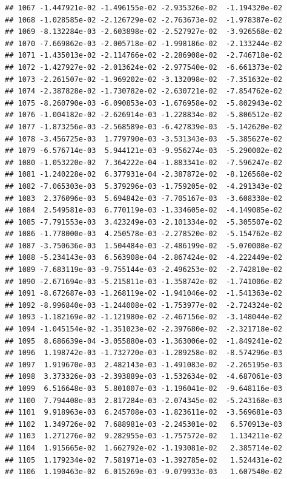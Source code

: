 \documentclass[
]{article}
\begin{document}
\begin{verbatim}
## 1067 -1.447921e-02 -1.496155e-02 -2.935326e-02  -1.194320e-02
## 1068 -1.028585e-02 -2.126729e-02 -2.763673e-02  -1.978387e-02
## 1069 -8.132284e-03 -2.603898e-02 -2.527927e-02  -3.926568e-02
## 1070 -7.669862e-03 -2.005718e-02 -1.998186e-02  -2.133244e-02
## 1071 -1.435013e-02 -2.114766e-02 -2.286908e-02  -2.746718e-02
## 1072 -1.427927e-02 -2.013624e-02 -2.977540e-02  -6.661373e-02
## 1073 -2.261507e-02 -1.969202e-02 -3.132098e-02  -7.351632e-02
## 1074 -2.387828e-02 -1.730782e-02 -2.630721e-02  -7.854762e-02
## 1075 -8.260790e-03 -6.090853e-03 -1.676958e-02  -5.802943e-02
## 1076 -1.004182e-02 -2.626914e-03 -1.228834e-02  -5.806512e-02
## 1077 -1.873256e-03 -2.568589e-03 -6.427839e-03  -5.142620e-02
## 1078 -3.456725e-03  1.779790e-03 -3.531343e-03  -5.385627e-02
## 1079 -6.576714e-03  5.944121e-03 -9.956274e-03  -5.290002e-02
## 1080 -1.053220e-02  7.364222e-04 -1.883341e-02  -7.596247e-02
## 1081 -1.240228e-02  6.377931e-04 -2.387872e-02  -8.126568e-02
## 1082 -7.065303e-03  5.379296e-03 -1.759205e-02  -4.291343e-02
## 1083  2.376096e-03  5.694842e-03 -7.705167e-03  -3.608338e-02
## 1084  2.549581e-03  6.770119e-03 -1.334605e-02  -4.149085e-02
## 1085 -7.791553e-03  3.423249e-03 -2.101334e-02  -5.305507e-02
## 1086 -1.778000e-03  4.250578e-03 -2.278520e-02  -5.154762e-02
## 1087 -3.750636e-03  1.504484e-03 -2.486199e-02  -5.070008e-02
## 1088 -5.234143e-03  6.563908e-04 -2.867424e-02  -4.222449e-02
## 1089 -7.683119e-03 -9.755144e-03 -2.496253e-02  -2.742810e-02
## 1090 -2.671694e-03 -5.215811e-03 -1.358742e-02  -1.741006e-02
## 1091 -8.672687e-03 -1.268119e-02 -1.941046e-02  -1.541363e-02
## 1092 -8.996840e-03 -1.244008e-02 -1.753977e-02  -2.724324e-02
## 1093 -1.182169e-02 -1.121980e-02 -2.467156e-02  -3.148044e-02
## 1094 -1.045154e-02 -1.351023e-02 -2.397680e-02  -2.321718e-02
## 1095  8.686639e-04 -3.055880e-03 -1.363006e-02  -1.849241e-02
## 1096  1.198742e-03 -1.732720e-03 -1.289258e-02  -8.574296e-03
## 1097  1.919670e-03  2.482143e-03 -1.491083e-02  -2.265195e-03
## 1098  3.373326e-03 -2.393889e-03 -1.532634e-02  -4.687061e-03
## 1099  6.516648e-03  5.801007e-03 -1.196041e-02  -9.648116e-03
## 1100  7.794408e-03  2.817284e-03 -2.074345e-02  -5.243168e-03
## 1101  9.918963e-03  6.245708e-03 -1.823611e-02  -3.569681e-03
## 1102  1.349726e-02  7.688981e-03 -2.245301e-02   6.570913e-03
## 1103  1.271276e-02  9.282955e-03 -1.757572e-02   1.134211e-02
## 1104  1.915665e-02  1.662792e-02 -1.193081e-02   2.385714e-02
## 1105  1.179234e-02  7.581971e-03 -1.392785e-02   1.524431e-02
## 1106  1.190463e-02  6.015269e-03 -9.079933e-03   1.607540e-02

\end{verbatim}
\end{document}

